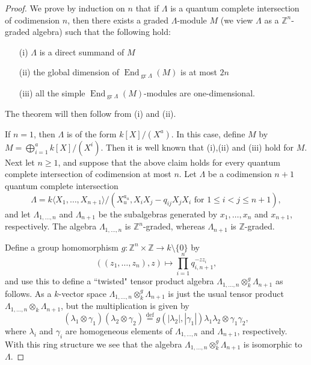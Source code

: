 \documentclass[a4paper]{amsart}
\theoremstyle{definition}
\theoremstyle{definition}
\theoremstyle{definition}
\theoremstyle{definition}
\theoremstyle{definition}
\theoremstyle{definition}
\theoremstyle{remark}
\theoremstyle{remark}
\theoremstyle{definition}
\theoremstyle{definition}
\begin{document}
\begin{proof}
We prove by induction on $n$ that if $\Lambda$ is a quantum complete
intersection of codimension $n$, then there exists a graded
$\Lambda$-module $M$ (we view $\Lambda$ as a $\mathbb{Z}^n$-graded
algebra) such that the following hold:
\begin{enumerate}
\item[(i)] $\Lambda$ is a direct summand of $M$
\item[(ii)] the global dimension of ${\operatorname{End}\nolimits}_{{\operatorname{gr}\nolimits} \Lambda}(M)$ is at most
$2n$
\item[(iii)] all the simple ${\operatorname{End}\nolimits}_{{\operatorname{gr}\nolimits} \Lambda}(M)$-modules are
one-dimensional.
\end{enumerate}
The theorem will then follow from (i) and (ii).

If $n=1$, then $\Lambda$ is of the form $k[X] / (X^a)$. In this
case, define $M$ by $M = \bigoplus_{i=1}^a k[X]/(X^i)$. Then it is
well known that (i),(ii) and (iii) hold for $M$. Next let $n \ge 1$,
and suppose that the above claim holds for every quantum complete
intersection of codimension at most $n$. Let $\Lambda$ be a
codimension $n+1$ quantum complete intersection
$$\Lambda = k \langle X_1, \dots, X_{n+1} \rangle / (X_u^{a_u}, X_iX_j -
q_{ij}X_jX_i \text{ for } 1 \le i <j \le n+1 ),$$ and let
$\Lambda_{1, \dots, n}$ and $\Lambda_{n+1}$ be the subalgebras
generated by $x_1, \dots, x_n$ and $x_{n+1}$, respectively. The
algebra $\Lambda_{1, \dots, n}$ is $\mathbb{Z}^n$-graded, whereas
$\Lambda_{n+1}$ is $\mathbb{Z}$-graded.

Define a group homomorphism $g \colon \mathbb{Z}^n \times \mathbb{Z}
\to k \setminus \{ 0 \}$ by
$$\left ( ( z_1, \dots, z_n ), z \right ) \mapsto \prod_{i=1}^n
q_{i,n+1}^{-zz_i},$$ and use this to define a ``twisted" tensor
product algebra $\Lambda_{1, \dots, n} \otimes^g_k \Lambda_{n+1}$ as
follows. As a $k$-vector space $\Lambda_{1, \dots, n} \otimes^g_k
\Lambda_{n+1}$ is just the usual tensor product $\Lambda_{1, \dots,
n} \otimes_k \Lambda_{n+1}$, but the multiplication is given by
$$( \lambda_1 \otimes \gamma_1 )( \lambda_2 \otimes \gamma_2 )
\stackrel{\text{def}}{=} g( | \lambda_2 |, | \gamma_1 | ) \lambda_1
\lambda_2 \otimes \gamma_1 \gamma_2,$$ where $\lambda_i$ and
$\gamma_i$ are homogeneous elements of $\Lambda_{1, \dots, n}$ and
$\Lambda_{n+1}$, respectively. With this ring structure we see that
the algebra $\Lambda_{1, \dots, n} \otimes^g_k \Lambda_{n+1}$ is
isomorphic to $\Lambda$.


\end{proof}
\end{document}
